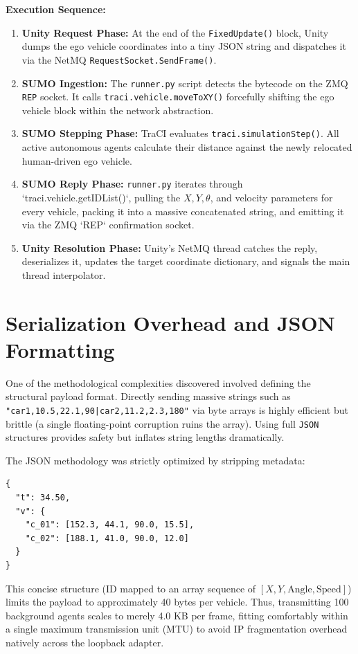 \textbf{Execution Sequence:}
\begin{enumerate}
    \item \textbf{Unity Request Phase:} At the end of the \texttt{FixedUpdate()} block, Unity dumps the ego vehicle coordinates into a tiny JSON string and dispatches it via the NetMQ \texttt{RequestSocket.SendFrame()}.
    \item \textbf{SUMO Ingestion:} The \texttt{runner.py} script detects the bytecode on the ZMQ \texttt{REP} socket. It calls \texttt{traci.vehicle.moveToXY()} forcefully shifting the ego vehicle block within the network abstraction.
    \item \textbf{SUMO Stepping Phase:} TraCI evaluates \texttt{traci.simulationStep()}. All active autonomous agents calculate their distance against the newly relocated human-driven ego vehicle.
    \item \textbf{SUMO Reply Phase:} \texttt{runner.py} iterates through `traci.vehicle.getIDList()`, pulling the $X, Y, \theta$, and velocity parameters for every vehicle, packing it into a massive concatenated string, and emitting it via the ZMQ `REP` confirmation socket.
    \item \textbf{Unity Resolution Phase:} Unity’s NetMQ thread catches the reply, deserializes it, updates the target coordinate dictionary, and signals the main thread interpolator.
\end{enumerate}

\section{Serialization Overhead and JSON Formatting}

One of the methodological complexities discovered involved defining the structural payload format. Directly sending massive strings such as \texttt{"car1,10.5,22.1,90|car2,11.2,2.3,180"} via byte arrays is highly efficient but brittle (a single floating-point corruption ruins the array). Using full \texttt{JSON} structures provides safety but inflates string lengths dramatically.

The JSON methodology was strictly optimized by stripping metadata:
\begin{lstlisting}
{
  "t": 34.50,
  "v": {
    "c_01": [152.3, 44.1, 90.0, 15.5],
    "c_02": [188.1, 41.0, 90.0, 12.0]
  }
}
\end{lstlisting}

This concise structure (ID mapped to an array sequence of $[X, Y, \text{Angle}, \text{Speed}]$) limits the payload to approximately 40 bytes per vehicle. Thus, transmitting 100 background agents scales to merely 4.0 KB per frame, fitting comfortably within a single maximum transmission unit (MTU) to avoid IP fragmentation overhead natively across the loopback adapter.

